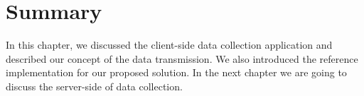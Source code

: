 \section{Summary}

In this chapter, we discussed the client-side data collection application and described our concept of the data transmission. We also introduced the reference implementation for our proposed solution. In the next chapter we are going to discuss the server-side of data collection.
%